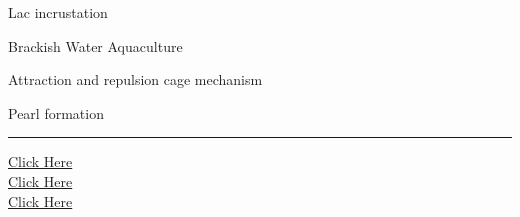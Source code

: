 \documentclass[11pt,a4paper]{article}
\begin{document}
\begin{parts}
  \item Lac incrustation
  \item Brackish Water Aquaculture
  \item Attraction and repulsion cage mechanism
  \item Pearl formation
\end{parts}

\vfill
\rule{\linewidth}{0.4pt}

\begin{center}\small
\href{https://bhu-exam.vercel.app/}{Click Here}\\[4pt]\href{https://me-aryan.vercel.app/}{Click Here}\\[4pt]\href{https://quashan-me.vercel.app/}{Click Here}
\end{center}
\end{document}
